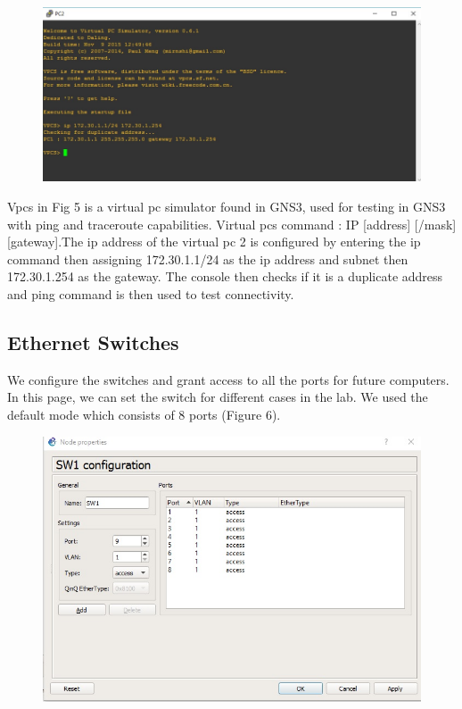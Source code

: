 \documentclass{article}
\begin{document}
\begin{figure}[H]
	\begin{center}
		\includegraphics[width=0.6
\textwidth]{VPC.jpg}
	\end{center}
	\caption{\small  \newline}
	\label{fig:VPC}
\end{figure}
Vpcs in Fig 5 is a virtual pc simulator found in GNS3, used for testing in GNS3 with ping and traceroute capabilities. Virtual pcs command : IP [address] [/mask] [gateway].The ip address of the virtual pc 2 is configured by entering the ip command then assigning 172.30.1.1/24 as the ip address and subnet then 172.30.1.254 as the gateway. The console then checks if it is a duplicate address and ping command is then used to test connectivity.

\subsection{Ethernet Switches}
We configure the switches and grant access to all the ports for future computers.
In this page, we can set the switch for different cases in the lab. We used the
default mode which consists of 8 ports (Figure 6).

\begin{figure}[H]
	\begin{center}
		\includegraphics[width=0.6
\textwidth]{Switchconf.jpg}
	\end{center}
	\caption{\small  \newline}
	\label{fig:Prd}
\end{figure}
\end{document}
